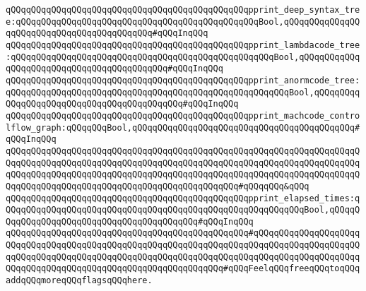 \verb|qQQqqQQqqQQqqQQqqQQqqQQqqQQqqQQqqQQqqQQqqQQqqQQqpprint_deep_syntax_tree:qQQqqQQqqQQqqQQqqQQqqQQqqQQqqQQqqQQqqQQqqQQqqQQqBool,qQQqqQQqqQQqqQQqqQQqqQQqqQQqqQQqqQQqqQQqqQQq#qQQqInqQQq|\newline
\verb|qQQqqQQqqQQqqQQqqQQqqQQqqQQqqQQqqQQqqQQqqQQqqQQqpprint_lambdacode_tree:qQQqqQQqqQQqqQQqqQQqqQQqqQQqqQQqqQQqqQQqqQQqqQQqqQQqBool,qQQqqQQqqQQqqQQqqQQqqQQqqQQqqQQqqQQqqQQqqQQq#qQQqInqQQq|\newline
\verb|qQQqqQQqqQQqqQQqqQQqqQQqqQQqqQQqqQQqqQQqqQQqqQQqpprint_anormcode_tree:qQQqqQQqqQQqqQQqqQQqqQQqqQQqqQQqqQQqqQQqqQQqqQQqqQQqqQQqBool,qQQqqQQqqQQqqQQqqQQqqQQqqQQqqQQqqQQqqQQqqQQq#qQQqInqQQq|\newline
\verb|qQQqqQQqqQQqqQQqqQQqqQQqqQQqqQQqqQQqqQQqqQQqqQQqpprint_machcode_controlflow_graph:qQQqqQQqBool,qQQqqQQqqQQqqQQqqQQqqQQqqQQqqQQqqQQqqQQqqQQq#qQQqInqQQq|\newline
\verb|qQQqqQQqqQQqqQQqqQQqqQQqqQQqqQQqqQQqqQQqqQQqqQQqqQQqqQQqqQQqqQQqqQQqqQQqqQQqqQQqqQQqqQQqqQQqqQQqqQQqqQQqqQQqqQQqqQQqqQQqqQQqqQQqqQQqqQQqqQQqqQQqqQQqqQQqqQQqqQQqqQQqqQQqqQQqqQQqqQQqqQQqqQQqqQQqqQQqqQQqqQQqqQQqqQQqqQQqqQQqqQQqqQQqqQQqqQQqqQQqqQQqqQQqqQQqqQQq#qQQqqQQq&qQQq|\newline
\verb|qQQqqQQqqQQqqQQqqQQqqQQqqQQqqQQqqQQqqQQqqQQqqQQqpprint_elapsed_times:qQQqqQQqqQQqqQQqqQQqqQQqqQQqqQQqqQQqqQQqqQQqqQQqqQQqqQQqqQQqBool,qQQqqQQqqQQqqQQqqQQqqQQqqQQqqQQqqQQqqQQqqQQq#qQQqInqQQq|\newline
\verb|qQQqqQQqqQQqqQQqqQQqqQQqqQQqqQQqqQQqqQQqqQQqqQQq#qQQqqQQqqQQqqQQqqQQqqQQqqQQqqQQqqQQqqQQqqQQqqQQqqQQqqQQqqQQqqQQqqQQqqQQqqQQqqQQqqQQqqQQqqQQqqQQqqQQqqQQqqQQqqQQqqQQqqQQqqQQqqQQqqQQqqQQqqQQqqQQqqQQqqQQqqQQqqQQqqQQqqQQqqQQqqQQqqQQqqQQqqQQqqQQqqQQqqQQqqQQq#qQQqFeelqQQqfreeqQQqtoqQQqaddqQQqmoreqQQqflagsqQQqhere.|\newline
